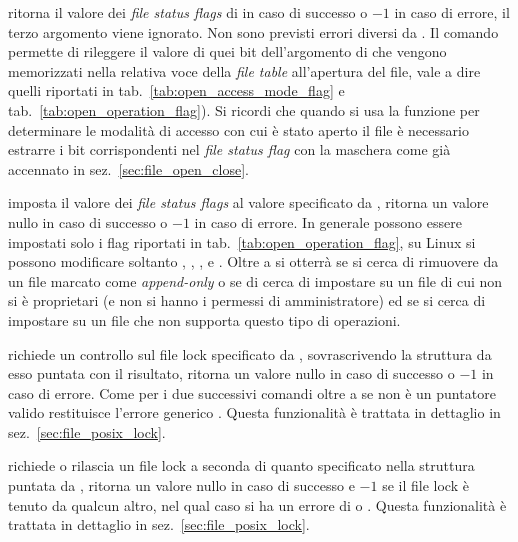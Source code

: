 \begin{basedescript}{\desclabelwidth{1.8cm}}
\item[\constd{F\_GETFL}] ritorna il valore dei \textit{file status flags} di
   in caso di successo o $-1$ in caso di errore, il terzo argomento
  viene ignorato. Non sono previsti errori diversi da . Il
  comando permette di rileggere il valore di quei bit
  dell'argomento  di  che vengono memorizzati nella
  relativa voce della \textit{file table} all'apertura del file, vale a dire
  quelli riportati in tab.~\ref{tab:open_access_mode_flag} e
  tab.~\ref{tab:open_operation_flag}). Si ricordi che quando si usa la
  funzione per determinare le modalità di accesso con cui è stato aperto il
  file è necessario estrarre i bit corrispondenti nel \textit{file status
    flag} con la maschera  come già accennato in
  sez.~\ref{sec:file_open_close}. 

\item[\constd{F\_SETFL}] imposta il valore dei \textit{file status flags} al
  valore specificato da , ritorna un valore nullo in caso di
  successo o $-1$ in caso di errore. In generale possono essere impostati solo
  i flag riportati in tab.~\ref{tab:open_operation_flag}, su Linux si possono
  modificare soltanto , , ,
   e . Oltre a  si otterrà
   se si cerca di rimuovere  da un file
  marcato come \textit{append-only} o se di cerca di impostare
   su un file di cui non si è proprietari (e non si hanno i
  permessi di amministratore) ed  se si cerca di impostare
   su un file che non supporta questo tipo di operazioni.

\item[\constd{F\_GETLK}] richiede un controllo sul file lock specificato da
  , sovrascrivendo la struttura da esso puntata con il risultato,
  ritorna un valore nullo in caso di successo o $-1$ in caso di errore. Come
  per i due successivi comandi oltre a  se  non è un
  puntatore valido restituisce l'errore generico . Questa
  funzionalità è trattata in dettaglio in sez.~\ref{sec:file_posix_lock}.

\item[\constd{F\_SETLK}] richiede o rilascia un file lock a seconda di quanto
  specificato nella struttura puntata da , ritorna un valore nullo
  in caso di successo e $-1$ se il file lock è tenuto da qualcun altro, nel
  qual caso si ha un errore di  o .  Questa
  funzionalità è trattata in dettaglio in sez.~\ref{sec:file_posix_lock}.


\end{basedescript}
